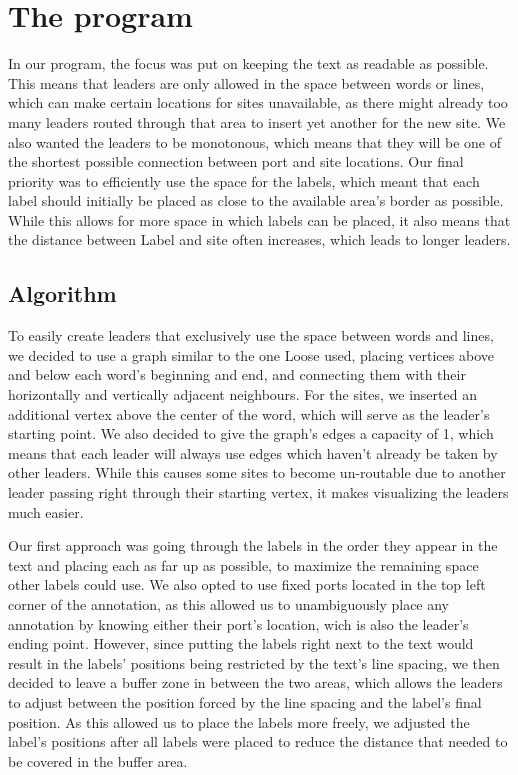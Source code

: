 \documentclass[11pt,a4paper]{vutinfth}
\begin{document}

\section{The program}

In our program, the focus was put on keeping the text as readable as possible. This means that leaders are only allowed in the space between words or lines, which can make certain locations for sites unavailable, as there might already too many leaders routed through that area to insert yet another for the new site. 
We also wanted the leaders to be monotonous, which means that they will be one of the shortest possible connection between port and site locations.
Our final priority was to efficiently use the space for the labels, which meant that each label should initially be placed as close to the available area's border as possible.
While this allows for more space in which labels can be placed, it also means that the distance between Label and site often increases, which leads to longer leaders.%

\subsection{Algorithm}%
To easily create leaders that exclusively use the space between words and lines, we decided to use a graph similar to the one Loose \cite{Loose2015} used, placing vertices above and below each word's beginning and end, and connecting them with their horizontally and vertically adjacent neighbours.%
For the sites, we inserted an additional vertex above the center of the word, which will serve as the leader's starting point. We also decided to give the graph's edges a capacity of 1, which means that each leader will always use edges which haven't already be taken by other leaders. While this causes some sites to become un-routable due to another leader passing right through their starting vertex, it makes visualizing the leaders much easier.

Our first approach was going through the labels in the order they appear in the text and placing each as far up as possible, to maximize the remaining space other labels could use. We also opted to use fixed ports located in the top left corner of the annotation, as this allowed us to unambiguously place any annotation by knowing either their port's location, wich is also the leader's ending point.
However, since putting the labels right next to the text would result in the labels' positions being restricted by the text's line spacing, we then decided to leave a buffer zone in between the two areas, which allows the leaders to adjust between the position forced by the line spacing and the label's final position. As this allowed us to place the labels more freely, we adjusted the label's positions after all labels were placed to reduce the distance that needed to be covered in the buffer area.
\end{document}

